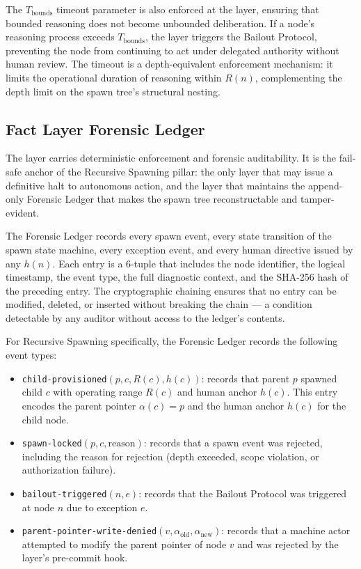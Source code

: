 The $T_{\text{bounds}}$ timeout parameter is also enforced at the \bounds{}
layer, ensuring that bounded reasoning does not become unbounded deliberation.
If a node's reasoning process exceeds $T_{\text{bounds}}$, the \bounds{} layer
triggers the Bailout Protocol, preventing the node from continuing to act under
delegated authority without human review.  The timeout is a depth-equivalent
enforcement mechanism: it limits the operational duration of reasoning within
$R(n)$, complementing the depth limit on the spawn tree's structural nesting.

\subsection{Fact Layer Forensic Ledger}
\label{sec:fact-layer-fledger}

The \fact{} layer carries deterministic enforcement and forensic auditability.
It is the fail-safe anchor of the Recursive Spawning pillar: the only layer
that may issue a definitive halt to autonomous action, and the layer that
maintains the append-only Forensic Ledger that makes the spawn tree
reconstructable and tamper-evident.

The Forensic Ledger records every spawn event, every state transition of the
spawn state machine, every exception event, and every human directive issued
by any $h(n)$.  Each entry is a 6-tuple that includes the node identifier, the
logical timestamp, the event type, the full diagnostic context, and the SHA-256
hash of the preceding entry.  The cryptographic chaining ensures that no entry
can be modified, deleted, or inserted without breaking the chain — a condition
detectable by any auditor without access to the ledger's contents.

For Recursive Spawning specifically, the Forensic Ledger records the following
event types:

\begin{itemize}
\item \texttt{child-provisioned}$(p, c, R(c), h(c))$: records that parent $p$
  spawned child $c$ with operating range $R(c)$ and human anchor $h(c)$.
  This entry encodes the parent pointer $\alpha(c) = p$ and the human anchor
  $h(c)$ for the child node.

\item \texttt{spawn-locked}$(p, c, \text{reason})$: records that a spawn event
  was rejected, including the reason for rejection (depth exceeded, scope
  violation, or authorization failure).

\item \texttt{bailout-triggered}$(n, e)$: records that the Bailout Protocol was
  triggered at node $n$ due to exception $e$.

\item \texttt{parent-pointer-write-denied}$(v, \alpha_{\text{old}},
  \alpha_{\text{new}})$: records that a machine actor attempted to modify the
  parent pointer of node $v$ and was rejected by the \fact{} layer's pre-commit
  hook.
\end{itemize}

